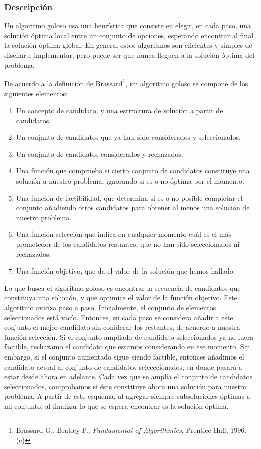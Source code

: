 \subsubsection{Descripción}

Un algoritmo goloso usa una heur\'istica que consiste en elegir, en cada paso, una soluci\'on \'optima local entre un conjunto de opciones, esperando encontrar al final la soluci\'on \'optima global. En general estos algoritmos son eficientes y simples de dise\~nar e implementar, pero puede ser que nunca lleguen a la soluci\'on \'optima del problema. 

De acuerdo a la definici\'on de Brassard\footnote{\label{Brassard}Brassard G., Bratley P., {\it Fundamental of Algorithmics}, Prentice Hall, 1996. (c)}, un algoritmo goloso se compone de los siguientes elementos: 

\begin{enumerate}
 \item Un concepto de candidato, y una estructura de solución a partir de candidatos.
 \item Un conjunto de candidatos que ya han sido considerados y seleccionados. 
 \item Un conjunto de candidatos considerados y rechazados. 
 \item Una funci\'on que comprueba si cierto conjunto de candidatos constituye una soluci\'on a nuestro problema, ignorando si es o no \'optima por el momento. 
 \item Una funci\'on de factibilidad, que determina si es o no posible completar el conjunto a\~nadiendo otros candidatos para obtener al menos una soluci\'on de nuestro problema. 
 \item Una funci\'on selecci\'on que indica en cualquier momento cu\'al es el m\'as prometedor de los candidatos restantes, que no han sido seleccionados ni rechazados. 
 \item Una funci\'on objetivo, que da el valor de la soluci\'on que hemos hallado. 
\end{enumerate}

Lo que busca el algoritmo goloso es encontrar la secuencia de candidatos que constituya una soluci\'on, y que optimice el valor de la funci\'on objetivo. Este algoritmo avanza paso a paso. Inicialmente, el conjunto de elementos seleccionados est\'a vac\'io. Entonces, en cada paso se considera a\~nadir a este conjunto el mejor candidato sin coniderar los restantes, de acuerdo a nuestra funci\'on selecci\'on. Si el conjunto ampliado de candidato seleccionados ya no fuera factible, rechazamo el candidato que estamos considerando en ese momento. Sin embargo, si el conjunto aumentado sigue siendo factible, entonces a\~nadimos el candidato actual al conjunto de candidatos selecccionados, en donde pasar\'a a estar desde ahora en adelante. Cada vez que se ampl\'ia el conjunto de candidatos seleccionados, comprobamos si \'este constituye ahora una soluci\'on para nuestro problema. A partir de este esquema, al agregar siempre subsoluciones \'optimas a mi conjunto, al finalizar lo que se espera encontrar es la soluci\'
on \'optima. 


